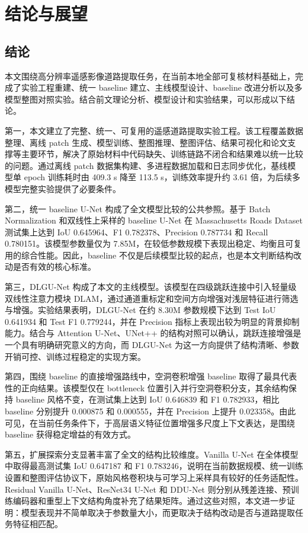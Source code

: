 
\chapter{结论与展望}
\label{cha:v2-conclusion}

\section{结论}
本文围绕高分辨率遥感影像道路提取任务，在当前本地全部可复核材料基础上，完成了实验工程重建、统一 baseline 建立、主线模型设计、baseline 改进分析以及多模型整图对照实验。结合前文理论分析、模型设计和实验结果，可以形成以下结论。

第一，本文建立了完整、统一、可复用的遥感道路提取实验工程。该工程覆盖数据整理、离线 patch 生成、模型训练、整图推理、整图评估、结果可视化和论文支撑等主要环节，解决了原始材料中代码缺失、训练链路不闭合和结果难以统一比较的问题。通过离线 patch 数据集构建、多进程数据加载和日志同步优化，基线模型单 epoch 训练耗时由 409.3 s 降至 113.5 s，训练效率提升约 3.61 倍，为后续多模型完整实验提供了必要条件。

第二，统一 baseline U-Net 构成了全文模型比较的公共参照。基于 Batch Normalization 和双线性上采样的 baseline U-Net 在 Massachusetts Roads Dataset 测试集上达到 IoU 0.645964、F1 0.782378、Precision 0.787734 和 Recall 0.780151。该模型参数量仅为 7.85M，在较低参数规模下表现出稳定、均衡且可复用的综合性能。因此，baseline 不仅是后续模型比较的起点，也是本文判断结构改动是否有效的核心标准。

第三，DLGU-Net 构成了本文的主线模型。该模型在四级跳跃连接中引入轻量级双线性注意力模块 DLAM，通过通道重标定和空间方向增强对浅层特征进行筛选与增强。实验结果表明，DLGU-Net 在约 8.30M 参数规模下达到 Test IoU 0.641934 和 Test F1 0.779244，并在 Precision 指标上表现出较为明显的背景抑制能力。结合与 Attention U-Net、UNet++ 的结构对照可以确认，跳跃连接增强是一个具有明确研究意义的方向，而 DLGU-Net 为这一方向提供了结构清晰、参数开销可控、训练过程稳定的实现方案。

第四，围绕 baseline 的直接增强路线中，空洞卷积增强 baseline 取得了最具代表性的正向结果。该模型仅在 bottleneck 位置引入并行空洞卷积分支，其余结构保持 baseline 风格不变，在测试集上达到 IoU 0.646839 和 F1 0.782933，相比 baseline 分别提升 0.000875 和 0.000555，并在 Precision 上提升 0.023358。由此可见，在当前任务条件下，于高层语义特征位置增强多尺度上下文表达，是围绕 baseline 获得稳定增益的有效方式。

第五，扩展探索分支显著丰富了全文的结构比较维度。Vanilla U-Net 在全体模型中取得最高测试集 IoU 0.647187 和 F1 0.783246，说明在当前数据规模、统一训练设置和整图评估协议下，原始风格卷积块与可学习上采样具有较好的任务适配性。Residual Vanilla U-Net、ResNet34 U-Net 和 DDU-Net 则分别从残差连接、预训练编码器和重型上下文结构角度补充了结果矩阵。通过这些对照，本文进一步证明：模型表现并不简单取决于参数量大小，而更取决于结构改动是否与道路提取任务特征相匹配。

